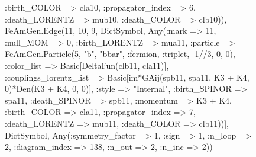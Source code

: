 \documentclass{revtex4}
\begin{document}
\begin{figure}[!htb]
\begin{center}
{:birth_COLOR => cla10, :propagator_index => 6, :death_LORENTZ => mub10, :death_COLOR => clb10)), FeAmGen.Edge(11, 10, 9, Dict{Symbol, Any}(:mark => 11, :null_MOM => 0, :birth_LORENTZ => mua11, :particle => FeAmGen.Particle(5, "b", "bbar", :fermion, :triplet, -1//3, 0, 0), :color_list => Basic[DeltaFun(clb11, cla11)], :couplings_lorentz_list => Basic[im*GAij(spb11, spa11, K3 + K4, 0)*Den(K3 + K4, 0, 0)], :style => "Internal", :birth_SPINOR => spa11, :death_SPINOR => spb11, :momentum => K3 + K4, :birth_COLOR => cla11, :propagator_index => 7, :death_LORENTZ => mub11, :death_COLOR => clb11))], Dict{Symbol, Any}(:symmetry_factor => 1, :sign => 1, :n_loop => 2, :diagram_index => 138, :n_out => 2, :n_inc => 2)) 
}
\end{center}
\end{figure}
\end{document}
